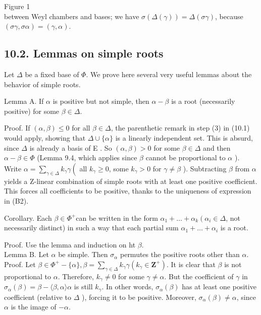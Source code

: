 \documentclass[10pt]{article}
\begin{document}
Figure 1\\
between Weyl chambers and bases; we have $\sigma(\Delta(\gamma))=\Delta(\sigma \gamma)$, because $(\sigma \gamma, \sigma \alpha)=(\gamma, \alpha)$.

\subsection*{10.2. Lemmas on simple roots}
Let $\Delta$ be a fixed base of $\Phi$. We prove here several very useful lemmas about the behavior of simple roots.

Lemma A. If $\alpha$ is positive but not simple, then $\alpha-\beta$ is a root (necessarily positive) for some $\beta \in \Delta$.

Proof. If $(\alpha, \beta) \leq 0$ for all $\beta \in \Delta$, the parenthetic remark in step (3) in (10.1) would apply, showing that $\Delta \cup\{\alpha\}$ is a linearly independent set. This is absurd, since $\Delta$ is already a basis of E . So $(\alpha, \beta)>0$ for some $\beta \in \Delta$ and then $\alpha-\beta \in \Phi$ (Lemma 9.4, which applies since $\beta$ cannot be proportional to $\alpha$ ). Write $\alpha=\sum_{\gamma \in \Delta} k_{\gamma} \gamma\left(\right.$ all $k_{\gamma} \geq 0$, some $k_{\gamma}>0$ for $\gamma \neq \beta$ ). Subtracting $\beta$ from $\alpha$ yields a Z-linear combination of simple roots with at least one positive coefficient. This forces all coefficients to be positive, thanks to the uniqueness of expression in (B2).

Corollary. Each $\beta \in \Phi^{+}$can be written in the form $\alpha_{1}+\ldots+\alpha_{k}\left(\alpha_{i} \in \Delta\right.$, not necessarily distinct) in such a way that each partial sum $\alpha_{1}+\ldots+\alpha_{i}$ is a root.

Proof. Use the lemma and induction on ht $\beta$.\\
Lemma B. Let $\alpha$ be simple. Then $\sigma_{\alpha}$ permutes the positive roots other than $\alpha$.\\
Proof. Let $\beta \in \Phi^{+}-\{\alpha\}, \beta=\sum_{\gamma \in \Delta} k_{\gamma} \gamma\left(k_{\gamma} \in \mathbf{Z}^{+}\right)$. It is clear that $\beta$ is not proportional to $\alpha$. Therefore, $k_{\gamma} \neq 0$ for some $\gamma \neq \alpha$. But the coefficient of $\gamma$ in $\sigma_{\alpha}(\beta)=\beta-\langle\beta, \alpha\rangle \alpha$ is still $k_{\gamma}$. In other words, $\sigma_{\alpha}(\beta)$ has at least one positive coefficient (relative to $\Delta$ ), forcing it to be positive. Moreover, $\sigma_{\alpha}(\beta) \neq \alpha$, since $\alpha$ is the image of $-\alpha$.
\end{document}
